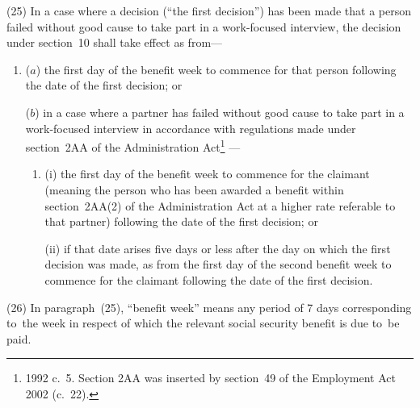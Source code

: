 \documentclass[12pt,a4paper]{article}
\begin{document}
(25) In a case where a decision (“the first decision”) has been made that a person failed without good cause to take part in a work-focused interview, the decision under section~10 shall take effect as from—
\begin{enumerate}\item[]
($a$) the first day of the benefit week to commence for that person following the date of the first decision; or

($b$) in a case where a partner has failed without good cause to take part in a work-focused interview 
in accordance with regulations made under section~2AA of the Administration Act\footnote{1992 c.~5. Section 2AA was inserted by section~49 of the Employment Act 2002 (c.~22).}%
—
\begin{enumerate}\item[]
(i) the first day of the benefit week to commence for the claimant 
(meaning the person who has been awarded a benefit within section~2AA(2) of the Administration Act at a higher rate referable to that partner)  %
following the date of the first decision; or

(ii) if that date arises five days or less after the day on which the first decision was made, as from the first day of the second benefit week to commence for the claimant following the date of the first decision.
\end{enumerate}
\end{enumerate}

(26) In paragraph~(25), “benefit week” means any period of 7 days corresponding to~the week in respect of which the relevant social security benefit is due to~be paid.
\end{document}
